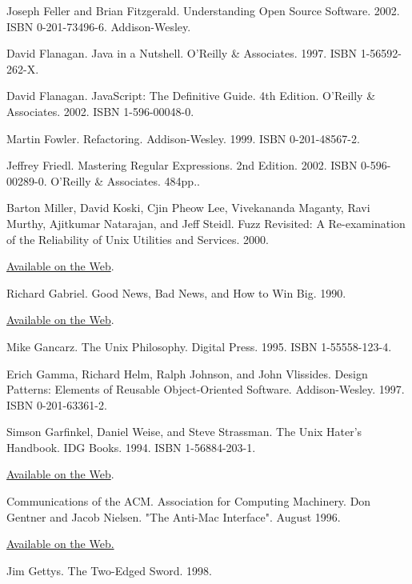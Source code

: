 \documentclass[12pt,oneside]{book}
\begin{document}
\begin{thebibliography}{9}
 Joseph Feller and Brian Fitzgerald. Understanding Open Source Software. 2002. ISBN 0-201-73496-6. Addison-Wesley.

 David Flanagan. Java in a Nutshell. O'Reilly \&{} Associates. 1997. ISBN 1-56592-262-X.

 David Flanagan. JavaScript: The Definitive Guide. 4th Edition. O'Reilly \&{} Associates. 2002. ISBN 1-596-00048-0.

 Martin Fowler. Refactoring. Addison-Wesley. 1999. ISBN 0-201-48567-2.

 Jeffrey Friedl. Mastering Regular Expressions. 2nd Edition. 2002. ISBN 0-596-00289-0. O'Reilly \&{} Associates. 484pp..

 Barton Miller, David Koski, Cjin Pheow Lee, Vivekananda Maganty, Ravi Murthy, Ajitkumar Natarajan, and Jeff Steidl. Fuzz Revisited: A Re-examination of the Reliability of Unix Utilities and Services. 2000.

\href{http://www.opensource.org/advocacy/fuzz-revisited.pdf}{Available on the Web}.

 Richard Gabriel. Good News, Bad News, and How to Win Big. 1990.

\href{http://www.dreamsongs.com/WorseIsBetter.html}{Available on the Web}.

 Mike Gancarz. The Unix Philosophy. Digital Press. 1995. ISBN 1-55558-123-4.

 Erich Gamma, Richard Helm, Ralph Johnson, and John Vlissides. Design Patterns: Elements of Reusable Object-Oriented Software. Addison-Wesley. 1997. ISBN 0-201-63361-2.

 Simson Garfinkel, Daniel Weise, and Steve Strassman. The Unix Hater's Handbook. IDG Books. 1994. ISBN 1-56884-203-1.

\href{http://research.microsoft.com/~daniel/unix-haters.html}{Available on the Web}.

 Communications of the ACM. Association for Computing Machinery. Don Gentner and Jacob Nielsen. "The Anti-Mac Interface". August 1996.

\href{http://www.acm.org/cacm/AUG96/antimac.htm}{Available on the Web.}

 Jim Gettys. The Two-Edged Sword. 1998.


\end{thebibliography}
\end{document}
